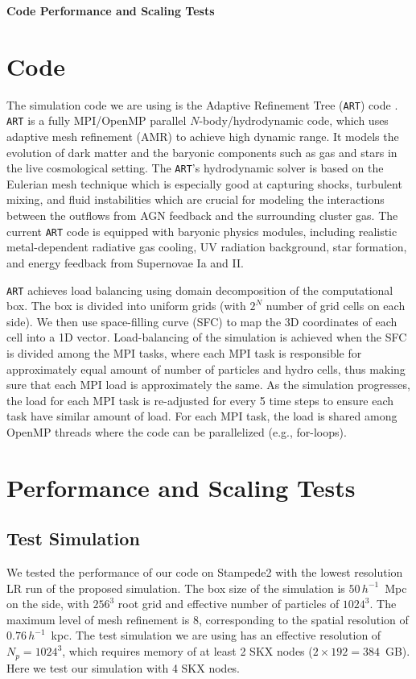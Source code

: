 \documentclass[letterpaper,11pt]{article}
\begin{document}
\pagestyle{plain}

\begin{center} 
\Large\bfseries{Code Performance and Scaling Tests}
\end{center}

\section{Code}

The simulation code we are using is the Adaptive Refinement Tree ({\tt ART}) code \citep{kra99,kra02, rudd_etal08}.  {\tt ART} is a fully MPI/OpenMP parallel $N$-body/hydrodynamic code, which uses adaptive mesh refinement (AMR) to achieve high dynamic range. It models the evolution of dark matter and the baryonic components such as gas and stars in the live cosmological setting. The {\tt ART}'s hydrodynamic solver is based on the Eulerian mesh technique which is especially good at capturing shocks, turbulent mixing, and fluid instabilities which are crucial for modeling the interactions between the outflows from AGN feedback and the surrounding cluster gas. The current {\tt ART} code is equipped with baryonic physics modules, including realistic metal-dependent radiative gas cooling, UV radiation background, star formation, and energy feedback from Supernovae Ia and II.  

{\tt ART} achieves load balancing using domain decomposition of the computational box. The box is divided into uniform grids (with $2^N$ number of grid cells on each side). We then use space-filling curve (SFC) to map the 3D coordinates of each cell into a 1D vector. Load-balancing of the simulation is achieved when the SFC is divided among the MPI tasks, where each MPI task is responsible for approximately equal amount of number of particles and hydro cells, thus making sure that each MPI load is approximately the same. As the simulation progresses, the load for each MPI task is re-adjusted for every 5 time steps to ensure each task have similar amount of load. For each MPI task, the load is shared among OpenMP threads where the code can be parallelized (e.g., for-loops). 

\section{Performance and Scaling Tests}

\subsection{Test Simulation}
We tested the performance of our code on Stampede2 with the lowest resolution LR run of the proposed simulation. The box size of the simulation is $50\,h^{-1}$~Mpc on the side, with $256^3$ root grid and effective number of particles of $1024^3$. The maximum level of mesh refinement is 8, corresponding to the spatial resolution of $0.76\,h^{-1}$~kpc. The test simulation we are using has an effective resolution of $N_p = 1024^3$, which requires memory of at least 2 SKX nodes ($2\times 192 = 384$~GB). Here we test our simulation with 4 SKX nodes. 
\end{document}
